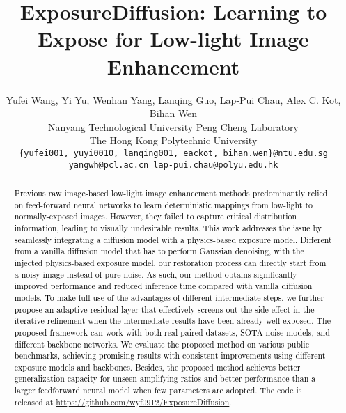 \documentclass[10pt,twocolumn,letterpaper]{article}
\newcommand{\wh}[1]{\textcolor{black}{#1}}
\newcommand{\bihan}[1]{\textcolor{black}{#1}} \iccvfinalcopy
\begin{document}
\title{ExposureDiffusion: Learning to Expose for Low-light Image Enhancement}
\author{Yufei Wang, Yi Yu, Wenhan Yang, Lanqing Guo, Lap-Pui Chau, Alex C. Kot, Bihan Wen\\
Nanyang Technological University \quad Peng Cheng Laboratory \\
The Hong Kong Polytechnic University \\
{\tt\small \{yufei001, yuyi0010, lanqing001, eackot, bihan.wen\}@ntu.edu.sg}\\ {\tt\small yangwh@pcl.ac.cn \quad lap-pui.chau@polyu.edu.hk}
}

\maketitle
\ificcvfinal\thispagestyle{empty}\fi


\begin{abstract}
\vspace{-0.1cm}
\wh{Previous raw image-based low-light image enhancement methods predominantly relied on feed-forward neural networks to learn deterministic mappings from low-light to normally-exposed images. However, they failed to capture critical distribution information, leading to visually undesirable results.}
\wh{This work addresses the issue by seamlessly integrating a diffusion model with a physics-based exposure model.
Different from a vanilla diffusion model that has to perform Gaussian denoising, with the injected physics-based exposure model, our restoration process can directly start from a noisy image instead of pure noise.
As such, our method obtains significantly improved performance and reduced inference time compared with vanilla diffusion models.
To make full use of the advantages of different intermediate steps, we further propose an adaptive residual layer that effectively screens out the side-effect in the iterative refinement when the intermediate results have been already well-exposed.}
\bihan{The proposed framework can work with both real-paired datasets, SOTA noise models, and different backbone networks.}
\bihan{We evaluate the proposed method on various public benchmarks, achieving promising results with consistent improvements using different exposure models and backbones.}
\wh{Besides, the proposed method achieves better generalization capacity for unseen amplifying ratios and better performance than a larger feedforward neural model when few parameters are adopted.} The code is released at 
\url{https://github.com/wyf0912/ExposureDiffusion}.
\end{abstract}
\end{document}
